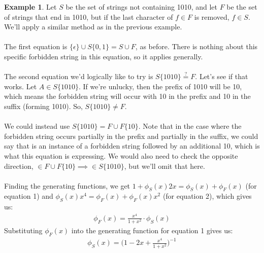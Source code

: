 \documentclass[]{article}
\theoremstyle{definition}
\newtheorem{ex}{Example}[section]
\begin{document}
				\begin{ex}
					Let $S$ be the set of strings not containing 1010, and let $F$ be the set of strings that end in 1010, but if the last character of $f \in F$ is removed, $f \in S$. We'll apply a similar method as in the previous example.
					\\ \\
					The first equation is $\{ \epsilon \} \cup S\{0, 1\} = S \cup F$, as before. There is nothing about this specific forbidden string in this equation, so it applies generally.
					\\ \\
					The second equation we'd logically like to try is $S \{ 1010 \} \stackrel{?}{=} F$. Let's see if that works. Let $A \in S\{1010\}$. If we're unlucky, then the prefix of 1010 will be 10, which means the forbidden string will occur with 10 in the prefix and 10 in the suffix (forming 1010). So, $S\{1010\} \not = F$.
					\\ \\
					We could instead use $S\{1010\} = F \cup F\{10\}$. Note that in the case where the forbidden string occurs partially in the prefix and partially in the suffix, we could say that is an instance of a forbidden string followed by an additional 10, which is what this equation is expressing. We would also need to check the opposite direction, $\in F \cup F\{10\} \implies \in S\{1010\}$, but we'll omit that here.
					\\ \\
					Finding the generating functions, we get $1 + \phi_S(x) 2x = \phi_S(x) + \phi_F(x)$ (for equation 1) and $\phi_S(x) x^4 = \phi_F(x) + \phi_F(x) x^2$ (for equation 2), which gives us:
					\begin{align*}
						\phi_F(x) = \frac{x^4}{1 + x^2} \cdot \phi_S(x)
					\end{align*}
					Substituting $\phi_F(x)$ into the generating function for equation 1 gives us:
					\begin{align*}
						\phi_S(x) = \bigg(1 - 2x + \frac{x^4}{1 + x^2}\bigg)^{-1}
					\end{align*}
				\end{ex}
\end{document}

